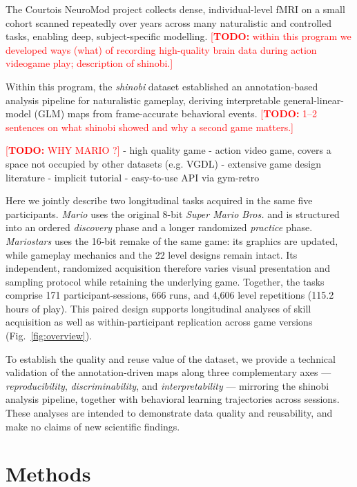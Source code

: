 \documentclass{article}
\newcommand{\TODO}[1]{\textcolor{red}{[\textbf{TODO:} #1]}}
\begin{document}
The Courtois NeuroMod project\cite{cneuromod2025,boyle2025ccn} collects dense, individual-level
fMRI on a small cohort scanned repeatedly over years across many naturalistic and controlled
tasks, enabling deep, subject-specific modelling. 
\TODO{within this program we developed ways (what) of recording high-quality brain data during
action videogame play; description of shinobi.}

Within this program, the \textit{shinobi}
dataset established an annotation-based analysis pipeline for naturalistic gameplay, deriving
interpretable general-linear-model (GLM) maps from frame-accurate behavioral
events\cite{harel2025shinobi}. \TODO{1--2 sentences on what shinobi showed and why a second game
matters.}

\TODO{WHY MARIO ?}
- high quality game
- action video game, covers a space not occupied by other datasets (e.g. VGDL)
- extensive game design literature
- implicit tutorial
- easy-to-use API via gym-retro

Here we jointly describe two longitudinal tasks acquired in the same five participants.
\textit{Mario} uses the original 8-bit \textit{Super Mario Bros.} and is structured into an
ordered \emph{discovery} phase and a longer randomized \emph{practice} phase. \textit{Mariostars}
uses the 16-bit remake of the same game: its graphics are updated, while gameplay mechanics and
the 22 level designs remain intact. Its independent, randomized acquisition therefore varies
visual presentation and sampling protocol while retaining the underlying game. Together, the
tasks comprise 171 participant-sessions, 666 runs, and 4{,}606 level repetitions (115.2 hours of
play). This paired design supports longitudinal analyses of skill acquisition as well as
within-participant replication across game versions (Fig.~\ref{fig:overview}).

To establish the quality and reuse value of the dataset, we provide a technical validation of
the annotation-driven maps along three complementary axes — \emph{reproducibility},
\emph{discriminability}, and \emph{interpretability} — mirroring the shinobi analysis
pipeline\cite{harel2025shinobi}, together with behavioral learning trajectories across sessions.
These analyses are intended to demonstrate data quality and reusability, and make no claims of
new scientific findings.


\section*{Methods}
\label{sec:methods}
\end{document}
